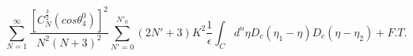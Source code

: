 \begin{equation}
\sum_{N=1}^{\infty}\frac{[C_N^{\frac{3}{2}}(cos{\theta_4^0})]^2}{N^2(N+3)^2}\sum_{N'=0}^{N'_0}(2N'+3)K^2 \frac{1}{\epsilon} \int_Cd^n\eta D_c(\eta_1 - \eta)D_c(\eta - \eta_2)
+ F. T.
\end{equation}

